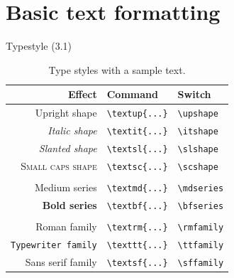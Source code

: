 \documentclass{beamer}
\newcommand{\switch}[1]{\texttt{\textbackslash#1}}
\newcommand{\command}[2]{\texttt{\textbackslash#1\{#2\}}}
\begin{document}
\section{Basic text formatting}
\begin{frame}{Typestyle (3.1)}

    \begin{table}[ht]
        \small
        \centering
        \begin{tabular}{rll}
            \toprule
            {\rmfamily\bfseries Effect}          & {\rmfamily\bfseries Command} & {\rmfamily\bfseries Switch} \\
            \midrule
            \textup{Upright shape}               & \command{textup}{...}        & \switch{upshape}            \\
            \textit{Italic shape}                & \command{textit}{...}        & \switch{itshape}            \\
            \textsl{Slanted shape}               & \command{textsl}{...}        & \switch{slshape}            \\
            \textsc{\rmfamily{}Small caps shape} & \command{textsc}{...}        & \switch{scshape}            \\
                                                 &                              &                             \\
            \textmd{Medium series}               & \command{textmd}{...}        & \switch{mdseries}           \\
            \textbf{Bold series}                 & \command{textbf}{...}        & \switch{bfseries}           \\
                                                 &                              &                             \\
            \textrm{Roman family}                & \command{textrm}{...}        & \switch{rmfamily}           \\
            \texttt{Typewriter family}           & \command{texttt}{...}        & \switch{ttfamily}           \\
            \textsf{Sans serif family}           & \command{textsf}{...}        & \switch{sffamily}           \\
            \bottomrule
        \end{tabular}
        \caption{Type styles with a sample text.}\label{tbltypestyle}
    \end{table}
\end{frame}
\end{document}
